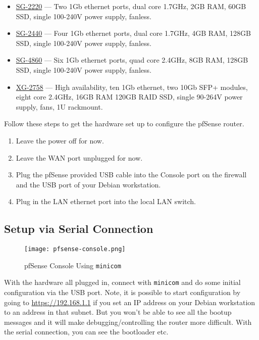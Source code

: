 \begin{itemize}
 \item \href{https://store.pfsense.org/SG-2220/}{SG-2220} --- Two 1Gb ethernet ports, dual core 1.7GHz, 2GB RAM, 60GB SSD, single 100-240V power supply, fanless.
 \item \href{https://store.pfsense.org/SG-2440/}{SG-2440} --- Four 1Gb ethernet ports, dual core 1.7GHz, 4GB RAM, 128GB SSD, single 100-240V power supply, fanless.
 \item \href{https://store.pfsense.org/SG-4860/}{SG-4860} --- Six 1Gb ethernet ports, quad core 2.4GHz, 8GB RAM, 128GB SSD, single 100-240V power supply, fanless.
 \item \href{https://store.pfsense.org/XG-2758-HA.aspx}{XG-2758} --- High availability, ten 1Gb ethernet, two 10Gb SFP+ modules, eight core 2.4GHz, 16GB RAM 120GB RAID SSD, single 90-264V power supply, fans, 1U rackmount.
\end{itemize}

Follow these steps to get the hardware set up to configure the pfSense router.

\begin{enumerate}
 \item Leave the power off for now.
 \item Leave the WAN port unplugged for now.
 \item Plug the pfSense provided USB cable into the Console port on the firewall and the USB port of your Debian workstation.
 \item Plug in the LAN ethernet port into the local LAN switch.
\end{enumerate}

\subsection{Setup via Serial Connection}
\begin{figure}[h!]
\begin{center}
\texttt{[image: pfsense-console.png]}
 \caption{pfSense Console Using \texttt{minicom}}
 \label{fig:pfsense-console}
\end{center}
\end{figure}

With the hardware all plugged in, connect with \texttt{minicom} and do some initial configuration via the USB port.
Note, it is possible to start configuration by going to \url{https://192.168.1.1} if you set an IP address on your
Debian workstation to an address in that subnet. But you won't be able to see all the bootup messages and it
will make debugging/controlling the router more difficult. With the serial connection, you can see the bootloader etc.


